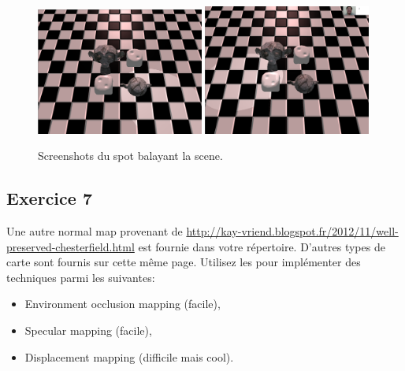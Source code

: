 \documentclass{article}
\begin{document}
\begin{figure}
  \begin{center}
    \includegraphics[width=0.49\textwidth]{images/spot}
    \includegraphics[width=0.49\textwidth]{images/spot2}
  \end{center}
  \caption{Screenshots du spot balayant la scene.}
  \label{fig:spot}
\end{figure}          

\subsection{Exercice 7}
\label{sec:exercice_7}

Une autre normal map provenant de
\url{http://kay-vriend.blogspot.fr/2012/11/well-preserved-chesterfield.html} est
fournie dans votre répertoire. D'autres types de carte sont fournis sur cette
même page. Utilisez les pour implémenter des techniques parmi les suivantes:

\begin{itemize}
  \item Environment occlusion mapping (facile),
  \item Specular mapping (facile),
  \item Displacement mapping (difficile mais cool).
\end{itemize}
\end{document}

